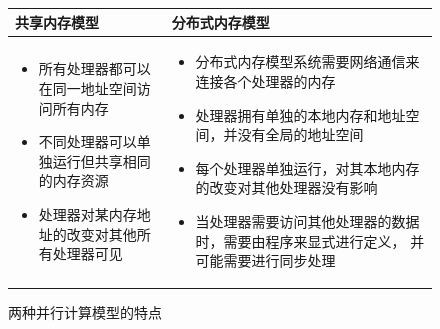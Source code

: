 \begin{figure}[ht]
\begin{tabularx}{\textwidth}{|X|X|}
\toprule
\textbf{共享内存模型} & \textbf{分布式内存模型} \\
\midrule
\begin{itemize}
    \item 所有处理器都可以在同一地址空间访问所有内存
    \item 不同处理器可以单独运行但共享相同的内存资源
    \item 处理器对某内存地址的改变对其他所有处理器可见
\end{itemize}    &
\begin{itemize}
    \item 分布式内存模型系统需要网络通信来连接各个处理器的内存
    \item 处理器拥有单独的本地内存和地址空间，并没有全局的地址空间
    \item 每个处理器单独运行，对其本地内存的改变对其他处理器没有影响
    \item 当处理器需要访问其他处理器的数据时，需要由程序来显式进行定义，
    并可能需要进行同步处理
\end{itemize} \\
\bottomrule
\end{tabularx}
\caption{两种并行计算模型的特点}
\label{parallel_model_keys}
\end{figure}

